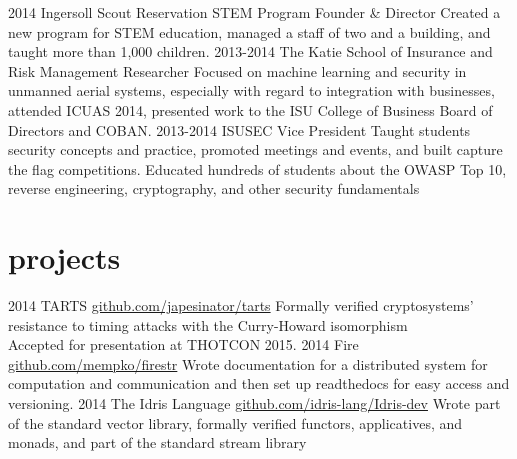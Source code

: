 \documentclass[]{friggeri-cv}
\begin{document}
\begin{entrylist}
  \entry
    {2014}
    {Ingersoll Scout Reservation}
    {STEM Program Founder \& Director}
    {Created a new program for STEM education, managed a staff of two and a building, and taught more than 1,000 children.}
  \entry
    {2013-2014}
    {The Katie School of Insurance and Risk Management}
    {Researcher}
    {Focused on machine learning and security in unmanned aerial systems, especially with regard to integration with businesses, attended ICUAS 2014, presented work to the ISU College of Business Board of Directors and COBAN.}
  \entry
    {2013-2014}
    {ISUSEC}
    {Vice President}
    {Taught students security concepts and practice, promoted meetings and events, and built capture the flag competitions. Educated hundreds of students about the OWASP Top 10, reverse engineering, cryptography, and other security fundamentals}
\end{entrylist}

\section{projects}

\begin{entrylist}
  \entry
    {2014}
    {TARTS}
    {\href{https://github.com/japesinator/tarts}{github.com/japesinator/tarts}}
    {Formally verified cryptosystems' resistance to timing attacks with the Curry-Howard isomorphism \\
    Accepted for presentation at THOTCON 2015.}
  \entry
    {2014}
    {Fire\star}
    {\href{https://github.com/mempko/firestr}{github.com/mempko/firestr}}
    {Wrote documentation for a distributed system for computation and communication and then set up readthedocs for easy access and versioning.}
  \entry
    {2014}
    {The Idris Language}
    {\href{https://github.com/idris-lang/Idris-dev}{github.com/idris-lang/Idris-dev}}
    {Wrote part of the standard vector library, formally verified functors, applicatives, and monads, and part of the standard stream library}
\end{entrylist}
\end{document}
